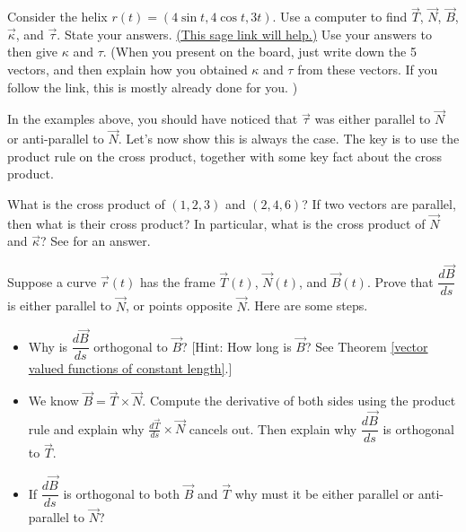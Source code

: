 \begin{problem}
 Consider the helix $r(t)=(4\sin t, 4\cos t, 3t)$. Use a computer to find $\vec T$, $\vec N$, $\vec B$, $\vec \kappa$, and $\vec \tau$. State your answers. \href{\sageurlforcurvature}{(This sage link will help.)} Use your answers to then give $\kappa$ and $\tau$. (When you present on the board, just write down the 5 vectors, and then explain how you obtained $\kappa$ and $\tau$ from these vectors. If you follow the link, this is mostly already done for you. )
\end{problem}

In the examples above, you should have noticed that $\vec \tau$ was either parallel to $\vec N$ or anti-parallel to $\vec N$.  Let's now show this is always the case. The key is to use the product rule on the cross product, together with some key fact about the cross product.
\begin{review*}
 What is the cross product of $(1,2,3)$ and $(2,4,6)$?  If two vectors are parallel, then what is their cross product?  In particular, what is the cross product of $\vec N$ and $\vec \kappa$? See  for an answer.
\end{review*}


\begin{problem}%
 Suppose a curve $\vec r(t)$ has the frame $\vec T(t)$, $\vec N(t)$, and $\vec B(t)$. Prove that $\dfrac{d\vec B}{ds}$ is either parallel to $\vec N$, or points opposite $\vec N$. Here are some steps.
 \begin{itemize}
  \item Why is $\dfrac{d\vec B}{ds}$ orthogonal to $\vec B$? [Hint: How long is $\vec B$? See Theorem \ref{vector valued functions of constant length}.]
  \item We know $\vec B=\vec T\times \vec N$. Compute the derivative of both sides using the product rule and explain why $\frac{d\vec T}{ds}\times \vec N$ cancels out. Then explain why $\dfrac{d\vec B}{ds}$ is orthogonal to $\vec T$.
  \item If $\dfrac{d\vec B}{ds}$ is orthogonal to both $\vec B$ and $\vec T$ why must it be either parallel or anti-parallel to $\vec N$?
 \end{itemize}
\end{problem}





